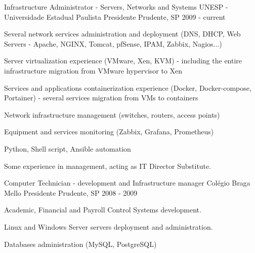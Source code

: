 

\begin{cventries}

  \cventry
    {Infrastructure Administrator - Servers, Networks and Systems} %
    {UNESP - Universidade Estadual Paulista} %
    {Presidente Prudente, SP} %
    {2009 - current} %
    {
      \begin{cvitems} %
        \item {Several network services administration and deployment (DNS, DHCP, Web Servers - Apache, NGINX, Tomcat, pfSense, IPAM, Zabbix, Nagios...)}
        \item {Server virtualization experience (VMware, Xen, KVM) - including the entire infrastructure migration from VMware hypervisor to Xen}
        \item {Services and applications containerization experience (Docker, Docker-compose, Portainer) - several services migration from VMs to containers}
        \item {Network infrastructure management (switches, routers, access points)}
        \item {Equipment and services monitoring (Zabbix, Grafana, Prometheus)}
        \item {Python, Shell script, Ansible automation}
        \item {Some experience in management, acting as IT Director Substitute.}
      \end{cvitems}
    }

  \cventry
    {Computer Technician - development and Infrastructure manager} %
    {Colégio Braga Mello} %
    {Presidente Prudente, SP} %
    {2008 - 2009} %
    {
      \begin{cvitems} %
        \item {Academic, Financial and Payroll Control Systems development.}
        \item {Linux and Windows Server servers deployment and administration.}
        \item {Databases administration (MySQL, PostgreSQL)}
      \end{cvitems}
    }



\end{cventries}
